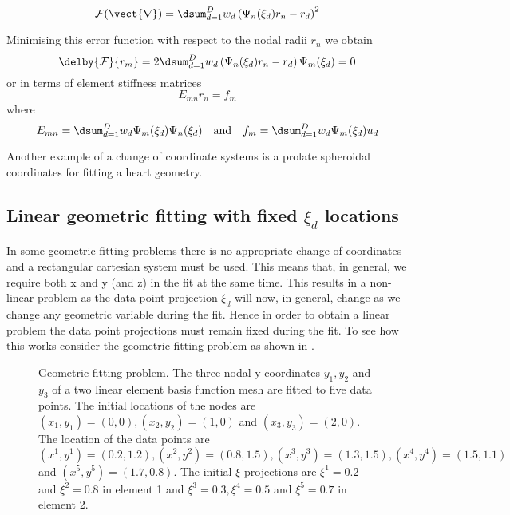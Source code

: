 \begin{equation}
  {\cal F(\vect{r})}=\dsum_{d=1}^{D}w_{d}\left(\Psi_{n}(\xi_{d})r_{n}-r_{d}
  \right)^{2}
\end{equation}

Minimising this error function with respect to the nodal radii $r_{n}$ we
obtain
\begin{equation}
  \delby{{\cal F}}{r_{m}}=2\dsum_{d=1}^{D}w_{d}\left(\Psi_n(\xi_{d})r_{n}-
    r_{d}\right)\Psi_m(\xi_{d}) = 0
\end{equation}
or in terms of element stiffness matrices
\begin{equation}
  E_{mn}r_{n}=f_{m}
\end{equation}
where
\begin{equation}
  E_{mn}=\dsum_{d=1}^{D}w_{d}\Psi_m(\xi_{d})\Psi_n(\xi_{d}) \quad \mbox{and} 
  \quad f_{m}=\dsum_{d=1}^{D}w_{d}\Psi_m(\xi_{d})u_{d}
\end{equation}

Another example of a change of coordinate systems is a prolate spheroidal
coordinates for fitting a heart geometry.

\subsection{Linear geometric fitting with fixed $\xi_{d}$ locations}

In some geometric fitting problems there is no appropriate change of 
coordinates and a rectangular cartesian system must be used. This means that,
in general, we require both x and y (and z) in the fit at the same time.
This results in a non-linear problem as the data point projection $\xi_{d}$
will now, in general, change as we change any geometric variable during the
fit. Hence in order to obtain a linear problem the data point projections
must remain fixed during the fit. To see how this works consider the geometric
fitting problem as shown in .

\begin{figure}[htpb] \centering
  \caption{Geometric fitting problem. The three nodal y-coordinates 
    $y_{1}, y_{2}$ and $y_{3}$ of a two linear element basis function mesh are
    fitted to five data points. The initial locations of the nodes are
    $(x_{1},y_{1})=(0,0), (x_{2},y_{2})=(1,0)$ and $(x_{3},y_{3})=(2,0)$. The
    location of the data points are
    $(x^{1},y^{1})=(0.2,1.2),(x^{2},y^{2})=(0.8,1.5),(x^{3},y^{3})=(1.3,1.5),
    (x^{4},y^{4})=(1.5,1.1)$ and $(x^{5},y^{5})=(1.7,0.8)$. The initial $\xi$
    projections are $\xi^{1}=0.2$ and $\xi^{2}=0.8$ in element 1 and
    $\xi^{3}=0.3,\xi^{4}=0.5$ and $\xi^{5}=0.7$ in element 2.}
  \label{fig:fixedxifitbefore}
\end{figure}

